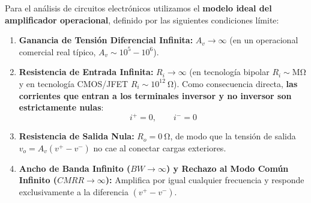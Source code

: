 \begin{center}
\end{center}

\begin{definicion}
Para el análisis de circuitos electrónicos utilizamos el \textbf{modelo ideal del amplificador operacional}, definido por las siguientes condiciones límite:
\begin{enumerate}[leftmargin=*]
    \item \textbf{Ganancia de Tensión Diferencial Infinita:} $A_v \to \infty$ (en un operacional comercial real típico, $A_v \sim 10^5 - 10^6$).
    \item \textbf{Resistencia de Entrada Infinita:} $R_i \to \infty$ (en tecnología bipolar $R_i \sim \si{\mega\ohm}$ y en tecnología CMOS/JFET $R_i \sim 10^{12}\ \si{\ohm}$). Como consecuencia directa, \textbf{las corrientes que entran a los terminales inversor y no inversor son estrictamente nulas}:
    \begin{equation}
        i^+ = 0, \qquad i^- = 0
    \end{equation}
    \item \textbf{Resistencia de Salida Nula:} $R_o = 0\ \si{\ohm}$, de modo que la tensión de salida $v_o = A_v(v^+ - v^-)$ no cae al conectar cargas exteriores.
    \item \textbf{Ancho de Banda Infinito ($BW \to \infty$) y Rechazo al Modo Común Infinito ($CMRR \to \infty$):} Amplifica por igual cualquier frecuencia y responde exclusivamente a la diferencia $(v^+ - v^-)$.
\end{enumerate}
\end{definicion}


